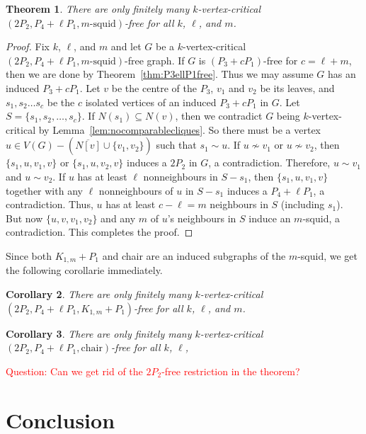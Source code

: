 \documentclass[11pt]{article}
\newtheorem{theorem}{Theorem}[section]
\newtheorem{corollary}[theorem]{Corollary}
\theoremstyle{definition}
\newcommand{\noneighbs}{\overline{N[v]}}
\begin{document}
\begin{theorem}
There are only finitely many $k$-vertex-critical $(2P_2,P_4+\ell P_1,m\text{-squid})$-free for all $k$, $\ell$, and $m$.
\end{theorem}
\begin{proof}
Fix $k$, $\ell$, and $m$ and let $G$ be a $k$-vertex-critical $(2P_2,P_4+\ell P_1,m\text{-squid})$-free graph. If $G$ is $(P_3+c P_1)$-free for $c= \ell+m$, then we are done by Theorem~\ref{thm:P3ellP1free}. Thus we may assume $G$ has an induced $P_3+c P_1$. Let $v$ be the centre of the $P_3$, $v_1$ and $v_2$ be its leaves, and $s_1,s_2\ldots s_c$ be the $c$ isolated vertices of an induced $P_3+c P_1$ in $G$. Let $S=\{s_1,s_2,\dots,s_c\}$. If $N(s_1)\subseteq N(v)$, then we contradict $G$ being $k$-vertex-critical by Lemma~\ref{lem:nocomparablecliques}. So there must be a vertex $u\in V(G)-(\noneighbs\cup \{v_1,v_2\})$ such that $s_1\sim u$. If $u\nsim v_1$ or $u\nsim v_2$, then $\{s_1,u,v_1,v\}$ or $\{s_1,u,v_2,v\}$ induces a $2P_2$ in $G$, a contradiction. Therefore, $u\sim v_1$ and $u\sim v_2$. If $u$ has at least $\ell$ nonneighbours in $S-s_1$, then $\{s_1,u,v_1,v\}$ together with any $\ell$ nonneighbours of $u$ in  $S-s_1$ induces a $P_4+\ell P_1$, a contradiction. Thus, $u$ has at least $c-\ell=m$ neighbours in $S$ (including $s_1$). But now $\{u,v,v_1,v_2\}$ and any $m$ of $u$'s neighbours in $S$ induce an $m$-squid, a contradiction. This completes the proof.
\end{proof}

Since both $K_{1,m}+P_1$ and chair are an induced subgraphs of the $m$-squid, we get the following corollarie immediately.

\begin{corollary}
There are only finitely many $k$-vertex-critical $(2P_2,P_4+\ell P_1,K_{1,m}+P_1)$-free for all $k$, $\ell$, and $m$.
\end{corollary}

\begin{corollary}
There are only finitely many $k$-vertex-critical $(2P_2,P_4+\ell P_1,\text{chair})$-free for all $k$, $\ell$,
\end{corollary}




\textcolor{red}{Question: Can we get rid of the $2P_2$-free restriction in the theorem?}

\section{Conclusion}
\end{document}
